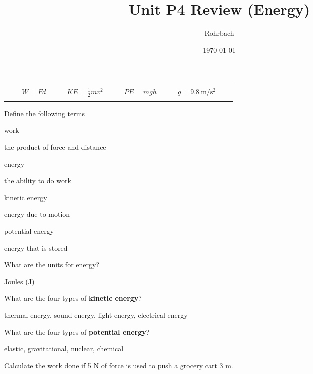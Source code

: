 \documentclass[10pt]{exam}
\title{Unit P4 Review (Energy)}
\author{Rohrbach}
\date{\today}
\newcommand{\printeqs}{
  \ifprintanswers
  \else
    \begin{center}
      \begin{tabular}{|*9c*5c|}
        \hline 
        &&&&&&&&&&&&&\\
        && 
        $W=Fd$                 & & & 
        $KE = \frac{1}{2}mv^2$ & & & 
        $PE=mgh$               & & & 
        $g=\SI{9.8}{\meter\per\second^2}$
        &&\\
        &&&&&&&&&&&&&\\
        \hline 
      \end{tabular}
    \end{center}
  \fi
}
\begin{document}
\maketitle

\printeqs 
\begin{questions}
  
 
\question
  Define the following terms

  \begin{parts}
    \item work
      \begin{solution}[3em]
        the product of force and distance
      \end{solution}

    \item energy
      \begin{solution}[3em]
        the ability to do work
      \end{solution}

    \item kinetic energy
      \begin{solution}[3em]
        energy due to motion
      \end{solution}

    \item potential energy
      \begin{solution}[3em]
        energy that is stored
      \end{solution}

  \end{parts}

\question
  What are the units for energy?
  
  \begin{solution}[3em]
    Joules (J)
  \end{solution}


\question
  What are the four types of {\bf kinetic energy}?

  \begin{solution}[\stretch{1}]
    thermal energy, sound energy, light energy, electrical energy
  \end{solution}


\question
  What are the four types of {\bf potential energy}?

  \begin{solution}[\stretch{1}]
    elastic, gravitational, nuclear, chemical
  \end{solution}


\question
  Calculate the work done if 5 N of force is used to push a grocery cart 3 m. 


\end{questions}
\end{document}
